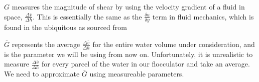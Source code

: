\documentclass[letterpaper,10pt,english]{sphinxmanual}
\begin{document}
\(G\) measures the magnitude of shear by using the velocity gradient of a fluid in space, \(\frac{\Delta \bar v}{\Delta h}\). This is essentially the same as the \(\frac{\delta u}{\delta y}\) term in fluid mechanics, which is found in the ubiquitous  as sourced from 

\(\bar G\) represents the average \(\frac{\Delta \bar v}{\Delta h}\) for the entire water volume under consideration, and is the parameter we will be using from now on. Unfortunately, it is unrealistic to measure \(\frac{\Delta \bar v}{\Delta h}\) for every parcel of the water in our flocculator and take an average. We need to approximate \(\bar G\) using measureable parameters.
\end{document}
